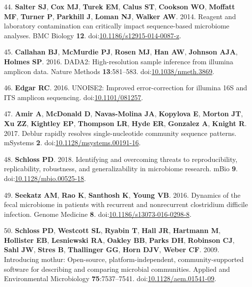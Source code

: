 \documentclass[11pt,]{article}
\begin{document}
\leavevmode\hypertarget{ref-Salter2014}{}%
44. \textbf{Salter SJ}, \textbf{Cox MJ}, \textbf{Turek EM},
\textbf{Calus ST}, \textbf{Cookson WO}, \textbf{Moffatt MF},
\textbf{Turner P}, \textbf{Parkhill J}, \textbf{Loman NJ},
\textbf{Walker AW}. 2014. Reagent and laboratory contamination can
critically impact sequence-based microbiome analyses. BMC Biology
\textbf{12}.
doi:\href{https://doi.org/10.1186/s12915-014-0087-z}{10.1186/s12915-014-0087-z}.

\leavevmode\hypertarget{ref-Callahan2016}{}%
45. \textbf{Callahan BJ}, \textbf{McMurdie PJ}, \textbf{Rosen MJ},
\textbf{Han AW}, \textbf{Johnson AJA}, \textbf{Holmes SP}. 2016. DADA2:
High-resolution sample inference from illumina amplicon data. Nature
Methods \textbf{13}:581--583.
doi:\href{https://doi.org/10.1038/nmeth.3869}{10.1038/nmeth.3869}.

\leavevmode\hypertarget{ref-Edgar2016}{}%
46. \textbf{Edgar RC}. 2016. UNOISE2: Improved error-correction for
illumina 16S and ITS amplicon sequencing.
doi:\href{https://doi.org/10.1101/081257}{10.1101/081257}.

\leavevmode\hypertarget{ref-Amir2017a}{}%
47. \textbf{Amir A}, \textbf{McDonald D}, \textbf{Navas-Molina JA},
\textbf{Kopylova E}, \textbf{Morton JT}, \textbf{Xu ZZ},
\textbf{Kightley EP}, \textbf{Thompson LR}, \textbf{Hyde ER},
\textbf{Gonzalez A}, \textbf{Knight R}. 2017. Deblur rapidly resolves
single-nucleotide community sequence patterns. mSystems \textbf{2}.
doi:\href{https://doi.org/10.1128/msystems.00191-16}{10.1128/msystems.00191-16}.

\leavevmode\hypertarget{ref-Schloss2018}{}%
48. \textbf{Schloss PD}. 2018. Identifying and overcoming threats to
reproducibility, replicability, robustness, and generalizability in
microbiome research. mBio \textbf{9}.
doi:\href{https://doi.org/10.1128/mbio.00525-18}{10.1128/mbio.00525-18}.

\leavevmode\hypertarget{ref-Seekatz2016}{}%
49. \textbf{Seekatz AM}, \textbf{Rao K}, \textbf{Santhosh K},
\textbf{Young VB}. 2016. Dynamics of the fecal microbiome in patients
with recurrent and nonrecurrent clostridium difficile infection. Genome
Medicine \textbf{8}.
doi:\href{https://doi.org/10.1186/s13073-016-0298-8}{10.1186/s13073-016-0298-8}.

\leavevmode\hypertarget{ref-Schloss2009}{}%
50. \textbf{Schloss PD}, \textbf{Westcott SL}, \textbf{Ryabin T},
\textbf{Hall JR}, \textbf{Hartmann M}, \textbf{Hollister EB},
\textbf{Lesniewski RA}, \textbf{Oakley BB}, \textbf{Parks DH},
\textbf{Robinson CJ}, \textbf{Sahl JW}, \textbf{Stres B},
\textbf{Thallinger GG}, \textbf{Horn DJV}, \textbf{Weber CF}. 2009.
Introducing mothur: Open-source, platform-independent,
community-supported software for describing and comparing microbial
communities. Applied and Environmental Microbiology
\textbf{75}:7537--7541.
doi:\href{https://doi.org/10.1128/aem.01541-09}{10.1128/aem.01541-09}.
\end{document}
